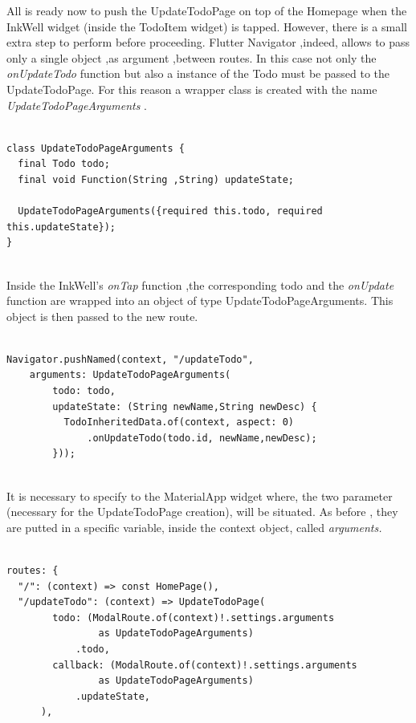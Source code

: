 All is ready now to push the UpdateTodoPage on top of the Homepage when the InkWell widget (inside the TodoItem widget) is tapped. However, there is a small extra step to perform before proceeding.  Flutter Navigator ,indeed, allows to pass only a single object ,as argument ,between routes. In this case not only the \textit{onUpdateTodo} function but also a instance of the Todo must be passed to the UpdateTodoPage. For this reason a wrapper class is created with the name \textit{UpdateTodoPageArguments }.
\mbox{}\\
\begin{code}

\begin{verbatim}

class UpdateTodoPageArguments {
  final Todo todo;
  final void Function(String ,String) updateState;

  UpdateTodoPageArguments({required this.todo, required this.updateState});
}
\end{verbatim}
\end{code}
\mbox{}\\
Inside the InkWell’s \textit{onTap }function ,the corresponding todo and the \textit{onUpdate} function are wrapped into an object of type UpdateTodoPageArguments. This object is then passed to the new route.
\mbox{}\\
\begin{code}

\begin{verbatim}

Navigator.pushNamed(context, "/updateTodo",
    arguments: UpdateTodoPageArguments(
        todo: todo,
        updateState: (String newName,String newDesc) {
          TodoInheritedData.of(context, aspect: 0)
              .onUpdateTodo(todo.id, newName,newDesc);
        }));
\end{verbatim}
\end{code}
\mbox{}\\
It is necessary to specify to the MaterialApp widget where, the two parameter (necessary for the UpdateTodoPage creation), will be situated. As before , they are putted in a specific variable, inside the context object, called \textit{arguments.}
\mbox{}\\
\begin{code}

\begin{verbatim}

routes: {
  "/": (context) => const HomePage(),
  "/updateTodo": (context) => UpdateTodoPage(
        todo: (ModalRoute.of(context)!.settings.arguments
                as UpdateTodoPageArguments)
            .todo,
        callback: (ModalRoute.of(context)!.settings.arguments
                as UpdateTodoPageArguments)
            .updateState,
      ),
\end{verbatim}
\end{code}

